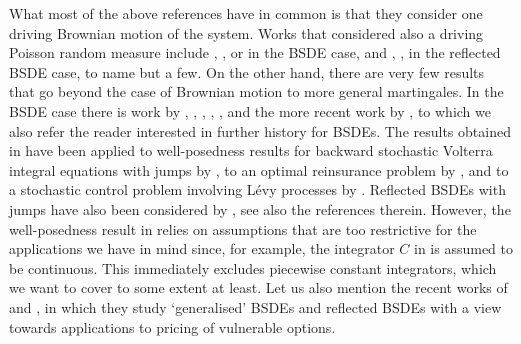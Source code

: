 \documentclass[10pt]{article} %
\begin{document}
\medskip
What most of the above references have in common is that they consider one driving Brownian motion of the system. Works that considered also a driving Poisson random measure include \citeauthor*{barles1997backward} \cite{barles1997backward}, \citeauthor*{royer2006backward} \cite{royer2006backward}, \citeauthor*{quenez2013bsdes} \cite{quenez2013bsdes} or \citeauthor*{becherer2019monotone} \cite{becherer2019monotone} in the BSDE case, and \citeauthor*{hamadene2003reflected} \cite{hamadene2003reflected}, \citeauthor*{crepey2008reflected} \cite{crepey2008reflected}, \citeauthor*{quenez2014reflected} \cite{quenez2014reflected} in the reflected BSDE case, to name but a few. On the other hand, there are very few results that go beyond the case of Brownian motion to more general martingales. In the BSDE case there is work by \citeauthor*{buckdahn1993backward} \cite{buckdahn1993backward}, \citeauthor*{elkaroui1997general} \cite{elkaroui1997general}, \citeauthor*{carbone2008backward} \cite{carbone2008backward}, \citeauthor*{confortola2014backward} \cite{confortola2014backward}, \citeauthor*{bandini2015existence} \cite{bandini2015existence}, \citeauthor*{cohen2012existence} \cite{cohen2012existence} and the more recent work by \citeauthor*{papapantoleon2018existence} \cite{papapantoleon2018existence}, to which we also refer the reader interested in further history for BSDEs. The results obtained in \cite{papapantoleon2018existence} have been applied to well-posedness results for backward stochastic Volterra integral equations with jumps by \citeauthor*{popier2021backward} \cite{popier2021backward}, to an optimal reinsurance problem by \citeauthor*{brachetta2022optimal} \cite{brachetta2022optimal}, and to a stochastic control problem involving Lévy processes by \citeauthor*{dinunno2022stochastic} \cite{dinunno2022stochastic}. Reflected BSDEs with jumps have also been considered by \citeauthor*{nie2022reflected} \cite{nie2022reflected}, see also the references therein. However, the well-posedness result in \cite{nie2022reflected} relies on assumptions that are too restrictive for the applications we have in mind since, for example, the integrator $C$ in \cite{nie2022reflected} is assumed to be continuous. This immediately excludes piecewise constant integrators, which we want to cover to some extent at least. Let us also mention the recent works of \citeauthor*{aksamit2023generalized} \cite{aksamit2023generalized} and \citeauthor*{li2022well} \cite{li2022well}, in which they study `generalised' BSDEs and reflected BSDEs with a view towards applications to pricing of vulnerable options.
\end{document}
